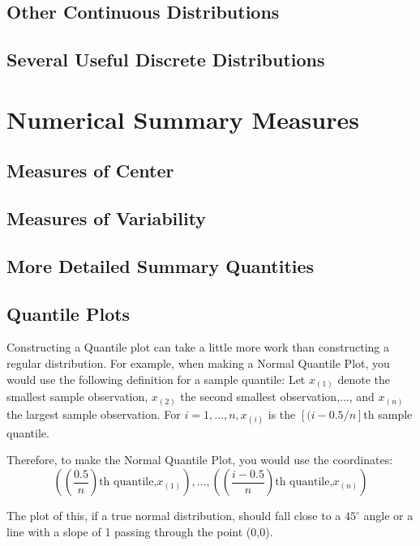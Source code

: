 \documentclass{article}
\begin{document}
	\subsection{Other Continuous Distributions} %
	
	\subsection{Several Useful Discrete Distributions} %

\clearpage
\section{Numerical Summary Measures} %

	\subsection{Measures of Center} %
	
	\subsection{Measures of Variability} %
	
	\subsection{More Detailed Summary Quantities} %

	\subsection{Quantile Plots} %
	Constructing a Quantile plot can take a little more work than constructing a regular 
	distribution. For example, when making a Normal Quantile Plot, you would use the 
	following definition for a sample quantile: Let $x_{(1)}$ denote the smallest sample 
	observation, $x_{(2)}$ the second smallest observation,$...$, and $x_{(n)}$ the largest 
	sample observation. For $i=1,...,n, x_{(i)}$ is the $[(i-0.5/n]$th sample quantile.
	
	Therefore, to make the Normal Quantile Plot, you would use the coordinates:
	\[ \left(\left(\frac{0.5}{n}\right)\text{th quantile,} x_{(1)}\right),...,\left(\left(\frac{i-0.5}{n}\right)
	\text{th quantile,} x_{(n)}\right)\]

	The plot of this, if a true normal distribution, should fall close to a $45^\circ$ angle or a line 
	with a slope of 1 passing through the point (0,0). \\
\end{document}
